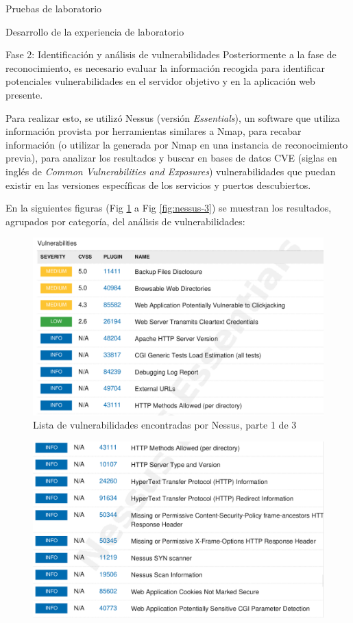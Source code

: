 \begin{section}{Pruebas de laboratorio}
\begin{subsection}{Desarrollo de la experiencia de laboratorio}
\begin{subsubsection} {Fase 2: Identificación y análisis de vulnerabilidades}
    Posteriormente a la fase de reconocimiento, es necesario evaluar la información recogida para identificar potenciales vulnerabilidades en el servidor objetivo y en la aplicación web presente. \par
    Para realizar esto, se utilizó Nessus (versión \textit{Essentials})\cite{nessus}, un software que utiliza información provista por herramientas similares a Nmap, para recabar información (o utilizar la generada por Nmap en una instancia de reconocimiento previa), para analizar los resultados y buscar en bases de datos CVE (siglas en inglés de \textit{Common Vulnerabilities and Exposures}) vulnerabilidades que puedan existir en las versiones específicas de los servicios y puertos descubiertos.\par
    En la siguientes figuras (Fig \ref{fig:nessus-1} a Fig \ref{fig:nessus-3}) se muestran los resultados, agrupados por categoría, del análisis de vulnerabilidades:
    \begin{figure}[H]
    \centering
    \includegraphics[width=1\textwidth]{./iteracion_3_imagenes/nessus-1.png}
    \caption{Lista de vulnerabilidades encontradas por Nessus, parte 1 de 3}
    \label{fig:nessus-1}
    \end{figure}
    \FloatBarrier 
     \begin{figure}[H]
    \centering
    \includegraphics[width=1\textwidth]{./iteracion_3_imagenes/nessus-2.png}

\end{figure}
\end{subsubsection}
\end{subsection}
\end{section}
